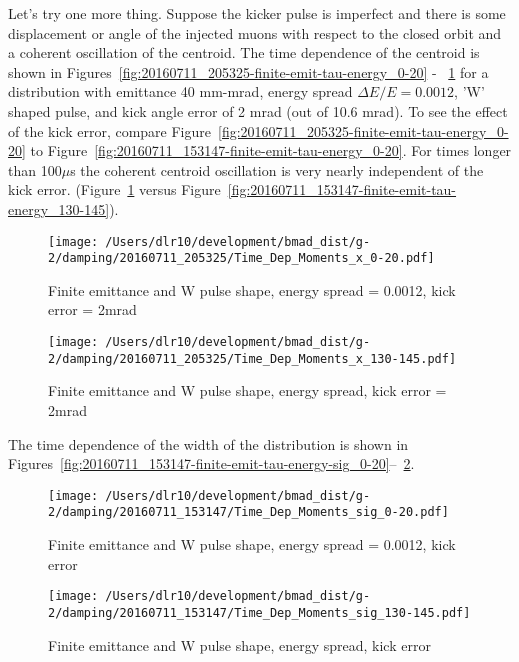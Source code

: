 \documentclass[10pt]{article}
\begin{document}
Let's try one more thing. Suppose the kicker pulse is imperfect and there is some displacement or angle of the injected muons with respect to the closed orbit
and a coherent oscillation of the centroid. The time dependence of the centroid is shown in Figures~\ref{fig:20160711_205325-finite-emit-tau-energy_0-20} -
~\ref{fig:20160711_205325-finite-emit-tau-energy_130-145} for a distribution with emittance 40 mm-mrad, energy spread $\Delta E/E=0.0012$, 'W' shaped
pulse, and kick angle error of 2 mrad (out of 10.6 mrad). To see the effect of the kick error, compare
Figure~\ref{fig:20160711_205325-finite-emit-tau-energy_0-20} to Figure~\ref{fig:20160711_153147-finite-emit-tau-energy_0-20}. For times longer 
than 100$\mu$s the coherent centroid oscillation is very nearly independent of the kick error. 
(Figure~\ref{fig:20160711_205325-finite-emit-tau-energy_130-145} versus
Figure~\ref{fig:20160711_153147-finite-emit-tau-energy_130-145}).
\begin{figure}[htbp] %
\begin{minipage}[t]{0.48\textwidth}
   \centering
   \texttt{[image: /Users/dlr10/development/bmad\_dist/g-2/damping/20160711\_205325/Time\_Dep\_Moments\_x\_0-20.pdf]} 
   \caption{Finite emittance and W pulse shape, energy spread = 0.0012, kick error = 2mrad\label{fig:20160711_205325-finite-emit-tau-energy_0-20}}
 \end{minipage}
\hfill
\begin{minipage}[t]{0.48\textwidth}
   \centering
   \texttt{[image: /Users/dlr10/development/bmad\_dist/g-2/damping/20160711\_205325/Time\_Dep\_Moments\_x\_130-145.pdf]} 
   \caption{Finite emittance and W pulse shape, energy spread, kick error = 2mrad\label{fig:20160711_205325-finite-emit-tau-energy_130-145}}
 \end{minipage}
\end{figure}

The time dependence of the width of the distribution is shown in Figures~\ref{fig:20160711_153147-finite-emit-tau-energy-sig_0-20}--~\ref{fig:20160711_153147-finite-emit-tau-energy-sig_130-145}.
\begin{figure}[htbp] %
\begin{minipage}[t]{0.48\textwidth}
   \centering
   \texttt{[image: /Users/dlr10/development/bmad\_dist/g-2/damping/20160711\_153147/Time\_Dep\_Moments\_sig\_0-20.pdf]} 
   \caption{Finite emittance and W pulse shape, energy spread = 0.0012, kick error\label{fig:20160711_153147-finite-emit-tau-energy-sig_0-20}}
 \end{minipage}
\hfill
\begin{minipage}[t]{0.48\textwidth}
   \centering
   \texttt{[image: /Users/dlr10/development/bmad\_dist/g-2/damping/20160711\_153147/Time\_Dep\_Moments\_sig\_130-145.pdf]} 
   \caption{Finite emittance and W pulse shape, energy spread, kick error\label{fig:20160711_153147-finite-emit-tau-energy-sig_130-145}}
 \end{minipage}
\end{figure}
\end{document}
